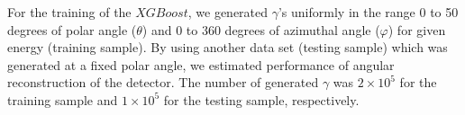 \documentclass[jkps,preprint,fleqn,showpacs,showkeys]{revtex4}
\newcommand{\XGB}{XGBoost}
\begin{document}
For the training of the $\XGB$, we generated $\gamma$'s uniformly in the range 0 to 50 degrees of polar angle ($\theta$) and  0 to 360 degrees of azimuthal angle ($\varphi$) for given energy (training sample). By using another data set (testing sample) which was generated at a fixed polar angle, we estimated performance of angular reconstruction of the detector. The number of generated $\gamma$ was
$2\times10^5$ for the training sample and $1\times10^5$ for the testing sample, respectively.



\end{document}
